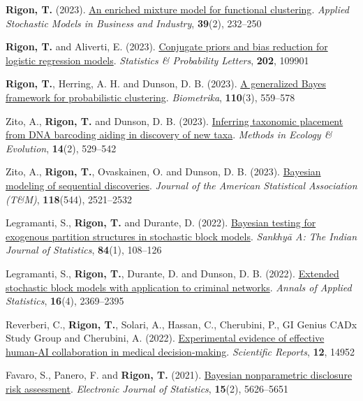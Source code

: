 \documentclass[a4paper,10pt]{article}
\begin{document}
\begin{pubs}
\item \textbf{Rigon, T.} (2023). \href{https://doi.org/10.1002/asmb.2736}{An enriched mixture model for functional clustering}. \emph{Applied Stochastic Models in Business and Industry}, \textbf{39}(2), 232--250
\item \textbf{Rigon, T.} and Aliverti, E. (2023). \href{https://doi.org/10.1016/j.spl.2023.109901}{Conjugate priors and bias reduction for logistic regression models}. \emph{Statistics \& Probability Letters}, \textbf{202}, 109901
\item \textbf{Rigon, T.}, Herring, A. H. and Dunson, D. B. (2023). \href{https://doi.org/10.1093/biomet/asad004}{A generalized Bayes framework for probabilistic clustering}. \emph{Biometrika}, \textbf{110}(3), 559--578
\item Zito, A., \textbf{Rigon, T.} and Dunson, D. B. (2023). \href{https://doi.org/10.1111/2041-210X.14009}{Inferring taxonomic placement from DNA barcoding aiding in discovery of new taxa}. \emph{Methods in Ecology \& Evolution}, \textbf{14}(2), 529--542
\item Zito, A., \textbf{Rigon, T.}, Ovaskainen, O. and Dunson, D. B. (2023). \href{https://doi.org/10.1080/01621459.2022.2060835}{Bayesian modeling of sequential discoveries}. \emph{Journal of the American Statistical Association (T\&M)}, \textbf{118}(544), 2521--2532
\item Legramanti, S., \textbf{Rigon, T.} and Durante, D. (2022). \href{https://doi.org/10.1007/s13171-020-00231-2}{Bayesian testing for exogenous partition structures in stochastic block models}. \emph{Sankhy\=a A: The Indian Journal of Statistics}, \textbf{84}(1), 108--126
\item Legramanti, S., \textbf{Rigon, T.}, Durante, D. and Dunson, D. B. (2022). \href{https://doi.org/10.1214/21-AOAS1595}{Extended stochastic block models with application to criminal networks}. \emph{Annals of Applied Statistics}, \textbf{16}(4), 2369--2395
\item Reverberi, C., \textbf{Rigon, T.}, Solari, A., Hassan, C., Cherubini, P., GI Genius CADx Study Group and Cherubini, A. (2022). \href{https://doi.org/10.1038/s41598-022-18751-2}{Experimental evidence of effective human-AI collaboration in medical decision-making}. \emph{Scientific Reports}, \textbf{12}, 14952
\item Favaro, S., Panero, F. and \textbf{Rigon, T.} (2021). \href{https://doi.org/10.1214/21-EJS1933}{Bayesian nonparametric disclosure risk assessment}. \emph{Electronic Journal of Statistics}, \textbf{15}(2), 5626--5651

\end{pubs}
\end{document}
